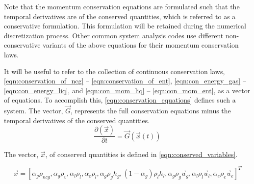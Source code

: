 Note that the momentum conservation equations are formulated such that the temporal derivatives are of the conserved quantities, which is referred to as a conservative formulation.
This formulation will be retained during the numerical discretization process.
Other common system analysis codes \cite{TRACE, RELAP} use different non-conservative variants of the above equations for their momentum conservation laws.

It will be useful to refer to the collection of continuous conservation laws, \eqref{eqn:conservation_of_ncg} -- \eqref{eqn:conservation_of_ent}, \eqref{eqn:con_energy_gas} -- \eqref{eqn:con_energy_liq}, and \eqref{eqn:con_mom_liq} -- \eqref{eqn:con_mom_ent}, as a vector of equations.
To accomplish this, \eqref{eqn:conservation_equations} defines such a system.
The vector, $\vec{G}$, represents the full conservation equations minus the temporal derivatives of the conserved quantities.
\begin{equation}
\label{eqn:conservation_equations}
\frac{\partial \left( \vec{x} \right)}{\partial t} = \vec{G}(\vec{x}(t))
\end{equation}

The vector, $\vec{x}$, of conserved quantities is defined in \eqref{eqn:conserved_variables}.

\begin{equation}
\label{eqn:conserved_variables}
\vec{x} = [\alpha_g \rho_{ncg}, \alpha_g \rho_v, \alpha_l \rho_l, \alpha_e \rho_l, \alpha_g \rho_g h_g, (1 - \alpha_g) \rho_l h_l, \alpha_g \rho_g \vec{u}_g, \alpha_l \rho_l \vec{u}_l, \alpha_e \rho_e \vec{u}_e]^{T}
\end{equation}

